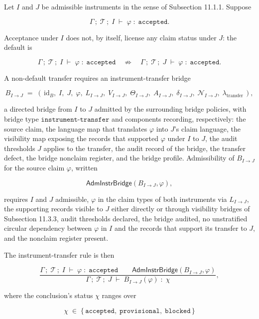 \documentclass[11pt]{article}
\theoremstyle{definition}
\begin{document}
Let \(I\) and \(J\) be admissible instruments in the sense of Subsection 11.1.1. Suppose

\[
\Gamma\,;\;\mathcal T\,;\;I\;\vdash\;\varphi\;:\;\texttt{accepted}.
\]

Acceptance under \(I\) does not, by itself, license any claim status under \(J\): the default is

\[
\Gamma\,;\;\mathcal T\,;\;I\;\vdash\;\varphi\;:\;\texttt{accepted}\quad\not\Longrightarrow\quad\Gamma\,;\;\mathcal T\,;\;J\;\vdash\;\varphi\;:\;\texttt{accepted}.
\]

A non-default transfer requires an instrument-transfer bridge

\[
B_{I\to J}\;=\;(\,\mathrm{id}_B,\;I,\;J,\;\varphi,\;L_{I\to J},\;V_{I\to J},\;\Theta_{I\to J},\;A_{I\to J},\;\delta_{I\to J},\;\mathcal N_{I\to J},\;\lambda_{\mathrm{transfer}}\,),
\]

a directed bridge from \(I\) to \(J\) admitted by the surrounding bridge policies, with bridge type \(\texttt{instrument-transfer}\) and components recording, respectively: the source claim, the language map that translates \(\varphi\) into \(J\)'s claim language, the visibility map exposing the records that supported \(\varphi\) under \(I\) to \(J\), the audit thresholds \(J\) applies to the transfer, the audit record of the bridge, the transfer defect, the bridge nonclaim register, and the bridge profile. Admissibility of \(B_{I\to J}\) for the source claim \(\varphi\), written

\[
\mathsf{AdmInstrBridge}(B_{I\to J},\varphi),
\]

requires \(I\) and \(J\) admissible, \(\varphi\) in the claim types of both instruments via \(L_{I\to J}\), the supporting records visible to \(J\) either directly or through visibility bridges of Subsection 11.3.3, audit thresholds declared, the bridge audited, no unstratified circular dependency between \(\varphi\) in \(I\) and the records that support its transfer to \(J\), and the nonclaim register present.

The instrument-transfer rule is then

\[
\frac{\Gamma\,;\;\mathcal T\,;\;I\;\vdash\;\varphi\;:\;\texttt{accepted}\quad\quad\mathsf{AdmInstrBridge}(B_{I\to J},\varphi)}{\Gamma\,;\;\mathcal T\,;\;J\;\vdash\;B_{I\to J}(\varphi)\;:\;\chi},
\]

where the conclusion's status \(\chi\) ranges over

\[
\chi\;\in\;\{\,\texttt{accepted},\;\texttt{provisional},\;\texttt{blocked}\,\}
\]
\end{document}
